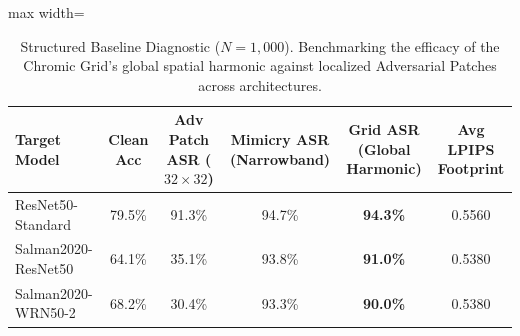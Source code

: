 \begin{table}[htbp]
\centering
\small
\caption{Structured Baseline Diagnostic ($N=1{,}000$). Benchmarking the efficacy of the Chromic Grid's global spatial harmonic against localized Adversarial Patches across architectures.}
\label{tab:structured_baselines}
\begin{adjustbox}{max width=\linewidth}
\begin{tabular}{@{}lccccc@{}}
\toprule
\textbf{Target Model} & \textbf{Clean Acc} & \textbf{Adv Patch ASR ($32 \times 32$)} & \textbf{Mimicry ASR (Narrowband)} & \textbf{Grid ASR (Global Harmonic)} & \textbf{Avg LPIPS Footprint} \\ \midrule
ResNet50-Standard & 79.5\% & 91.3\% & 94.7\% & \textbf{94.3\%} & 0.5560 \\
Salman2020-ResNet50 & 64.1\% & 35.1\% & 93.8\% & \textbf{91.0\%} & 0.5380 \\
Salman2020-WRN50-2 & 68.2\% & 30.4\% & 93.3\% & \textbf{90.0\%} & 0.5380 \\
\bottomrule
\end{tabular}
\end{adjustbox}
\end{table}
